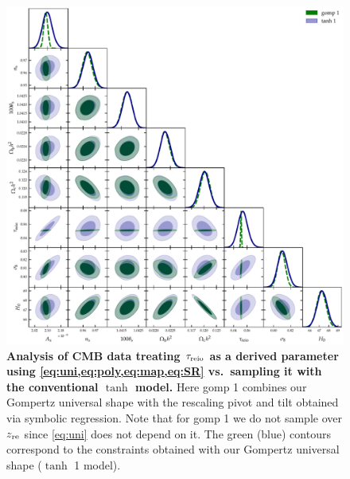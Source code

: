 \begin{figure}[t]
\centering
\includegraphics[width=\linewidth]{figs/gomp_tanh_triangle_kill_full.pdf}
\caption{\textbf{Analysis of CMB data treating $\tau_{\mathrm{reio}}$ as a derived
parameter using \cref{eq:uni,eq:poly,eq:map,eq:SR} vs.\ sampling it with
the conventional $\tanh$ model.} Here gomp 1 combines our Gompertz universal
shape with the rescaling pivot and tilt obtained via symbolic regression. Note that for
gomp 1 we do not sample over $z_{\mathrm{re}}$ since \cref{eq:uni} does not depend on it.
The green (blue) contours correspond to the constraints obtained with
our Gompertz universal shape ($\tanh$ 1 model).}
\label{fig:unleashed_gomp}
\end{figure}

